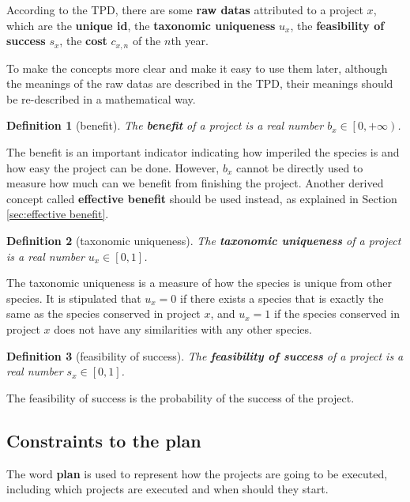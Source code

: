 \documentclass{article}
\newtheorem{definition}{Definition}
\begin{document}
According to the TPD, there are some \textbf{raw datas} attributed to a project $x$, which are
the \textbf{unique id}, the \textbf{taxonomic uniqueness} $u_x$, the \textbf{feasibility of success} $s_x$, the \textbf{cost} $c_{x,n}$ of the $n$th year.

To make the concepts more clear and make it easy to use them later,
although the meanings of the raw datas are described in the TPD,
their meanings should be re-described in a mathematical way.

\begin{definition}[benefit]
The \textbf{benefit} of a project is a real number $b_x\in\left[0,+\infty\right)$.
\end{definition}

The benefit is an important indicator indicating how imperiled the species is and how easy the project can be done.
However, $b_x$ cannot be directly used to measure how much can we benefit from finishing the project.
Another derived concept called \textbf{effective benefit} should be used instead, as explained in Section \ref{sec:effective benefit}.

\begin{definition}[taxonomic uniqueness]
The \textbf{taxonomic uniqueness} of a project is a real number $u_x\in\left[0,1\right]$.
\end{definition}

The taxonomic uniqueness is a measure of how the species is unique from other species.
It is stipulated that $u_x=0$ if there exists a species that is exactly the same as the species conserved in project $x$,
and $u_x=1$ if the species conserved in project $x$ does not have any similarities with any other species.

\begin{definition}[feasibility of success]
The \textbf{feasibility of success} of a project is a real number $s_x\in\left[0,1\right]$.
\end{definition}

The feasibility of success is the probability of the success of the project.

\subsection{Constraints to the plan}

The word \textbf{plan} is used to represent how the projects are going to be executed,
including which projects are executed and when should they start.
\end{document}
